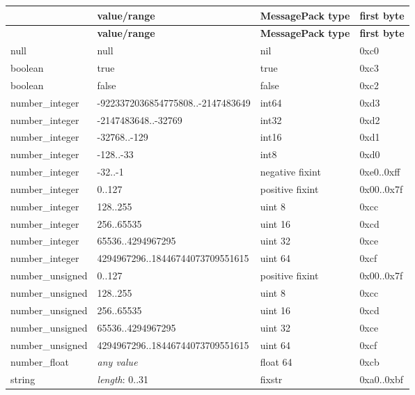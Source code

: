 \tabulinesep=1mm
\begin{longtabu} spread 0pt [c]{*4{|X[-1]}|}
\hline
{}&{\bf value/range }&{\bf Message\+Pack type }&{\bf first byte  }\\
\endfirsthead
\hline
\endfoot
\hline
{}&{\bf value/range }&{\bf Message\+Pack type }&{\bf first byte  }\\
\endhead
null &{\ttfamily null} &nil &0xc0 \\
boolean &{\ttfamily true} &true &0xc3 \\
boolean &{\ttfamily false} &false &0xc2 \\
number\+\_\+integer &-\/9223372036854775808..-\/2147483649 &int64 &0xd3 \\
number\+\_\+integer &-\/2147483648..-\/32769 &int32 &0xd2 \\
number\+\_\+integer &-\/32768..-\/129 &int16 &0xd1 \\
number\+\_\+integer &-\/128..-\/33 &int8 &0xd0 \\
number\+\_\+integer &-\/32..-\/1 &negative fixint &0xe0..0xff \\
number\+\_\+integer &0..127 &positive fixint &0x00..0x7f \\
number\+\_\+integer &128..255 &uint 8 &0xcc \\
number\+\_\+integer &256..65535 &uint 16 &0xcd \\
number\+\_\+integer &65536..4294967295 &uint 32 &0xce \\
number\+\_\+integer &4294967296..18446744073709551615 &uint 64 &0xcf \\
number\+\_\+unsigned &0..127 &positive fixint &0x00..0x7f \\
number\+\_\+unsigned &128..255 &uint 8 &0xcc \\
number\+\_\+unsigned &256..65535 &uint 16 &0xcd \\
number\+\_\+unsigned &65536..4294967295 &uint 32 &0xce \\
number\+\_\+unsigned &4294967296..18446744073709551615 &uint 64 &0xcf \\
number\+\_\+float &{\itshape any value} &float 64 &0xcb \\
string &{\itshape length}\+: 0..31 &fixstr &0xa0..0xbf \\

\end{longtabu}
